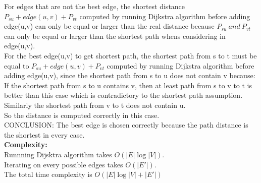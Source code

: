 \documentclass{article}
\begin{document}
For edges that are not the best edge, the shortest distance $P_{su}+edge(u,v)+P_{vt}$ computed by running Dijkstra algorithm before adding edge(u,v) can only be equal or larger than the real distance because $P_{su}\ and\ P_{vt}$ can only be equal or larger than the shortest path whens considering in edge(u,v).\\
For the best edge(u,v) to get shortest path, the shortest path from s to t must be equal to $P_{su}+edge(u,v)+P_{vt}$ computed by running Dijkstra algorithm before adding edge(u,v), since the shortest path from s to u does not contain v because:\\ If the shortest path from s to u contains v, then at least path from s to v to t is better than this case which is contradictory to the shortest path assumption. Similarly the shortest path from v to t does not contain u.\\ So the distance is computed correctly in this case.\\
CONCLUSION: The best edge is chosen correctly because the path distance is the shortest in every case.\\
\textbf{\large Complexity:\\}
Runnning Dijsktra algorithm takes $O(|E|\log |V|)$.\\
Iterating on every possible edges takes $O(|E'|)$.\\
The total time complexity is $O(|E|\log |V|+|E'|)$


\clearpage
\end{document}
